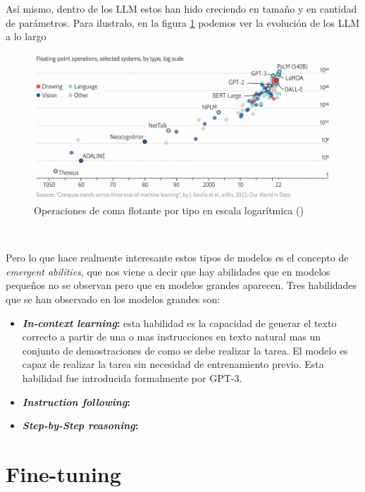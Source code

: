 Así mismo, dentro de los LLM estos han hido creciendo en tamaño y en cantidad de parámetros.
Para ilustralo, en la figura \ref{fig:evolutionLLM} podemos ver la evolución de los LLM a lo largo

\begin{figure}[H]
    \begin{center}
      \includegraphics[width=15cm]{figuras/Capitulo_09/EvolutionLLM.png}
    \end{center}
    \caption[Operaciones de coma flotante por tipo en escala logarítmica]{Operaciones de coma flotante por tipo en escala logarítmica (\cite{EvolutionLLM})}
    \label{fig:evolutionLLM}
\end{figure}\

Pero lo que hace realmente interesante estos tipos de modelos es el concepto de
\textit{emergent abilities}, que nos viene a decir que hay abilidades que en 
modelos pequeños no se observan pero que en modelos grandes aparecen. Tres
habilidades que se han observado en los modelos grandes son:

\begin{itemize}
    \item \textbf{\textit{In-context learning}:} esta habilidad es la capacidad
        de generar el texto correcto a partir de una o mas instrucciones en texto
        natural mas un conjunto de demostraciones de como se debe realizar la tarea.
        El modelo es capaz de realizar la tarea sin necesidad de entrenamiento previo.
        Esta habilidad fue introducida formalmente por GPT-3.
    \item \textbf{\textit{Instruction following}:}
    \item \textbf{\textit{Step-by-Step reasoning}:}
\end{itemize}

\section{Fine-tuning}
\label{sec:fine_tuning}

